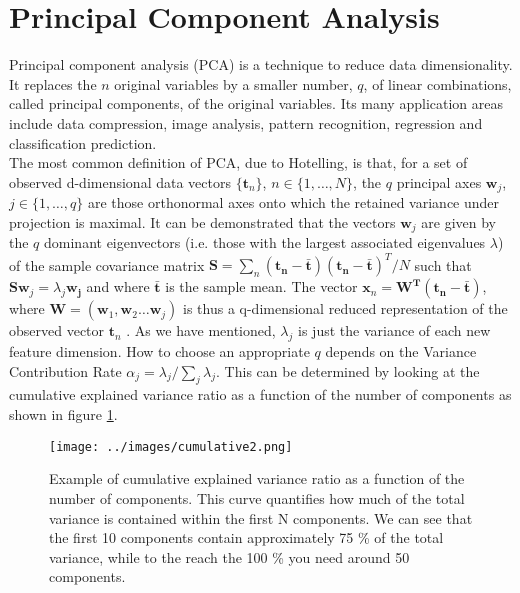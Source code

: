 \documentclass{standalone}
\begin{document}
\section{Principal Component Analysis}
Principal component analysis (PCA) is a technique to reduce data dimensionality.
It replaces the $n$ original variables by a smaller number, $q$, of linear combinations, called principal components, of the original variables.
Its many application areas include data compression, image analysis, pattern recognition, regression and classification prediction\cite{PCA}.\\
The most common definition of PCA, due to Hotelling, is that, for a set of observed d-dimensional data vectors 
$ \{ \mathbf{t}_{n} \}$, $n \in \{1, \dots, N \} $, the $q$ principal axes $\mathbf{w}_j$, $j \in \{ 1, \dots, q \} $ are those orthonormal axes onto which the retained variance under projection is maximal.
It can be demonstrated that the vectors $\mathbf{w}_j$ are given by the $q$ dominant eigenvectors (i.e. those with the largest associated eigenvalues $\lambda$) of the sample covariance matrix $\mathbf{S} = \sum_{n}^{} ( \mathbf{t_n} - \mathbf{\bar{t}}) ( \mathbf{t_n} - \mathbf{\bar{t}})^T / N$ such that  $ \mathbf{S}\mathbf{w}_j = \lambda_j \mathbf{w_j}$ and where $\mathbf{\bar{t}}$ is the sample mean.
The vector $\mathbf{x}_{n} = \mathbf{W^T} (\mathbf{t_n} - \mathbf{\bar{t}})$, where $ \mathbf{W} = (\mathbf{w}_1 , \mathbf{w}_2 \dots \mathbf{w}_j)$ is thus a q-dimensional reduced representation of the observed vector $\mathbf{t}_{n}$ \cite{PCA}.
As we have mentioned, $\lambda_j$ is just the variance of each new feature dimension.
How to choose an appropriate $q$ depends on the Variance Contribution Rate  $\alpha_j = \lambda_j / \sum_{j}^{} \lambda_j $. 
This can be determined by looking at the cumulative explained variance ratio as a function of the number of components as shown in figure \ref{cumulativevr}.

\begin{figure}[ht]

    \centering
    \texttt{[image: ../images/cumulative2.png]}
    
    \caption{Example of cumulative explained variance ratio as a function of the number of components. This curve quantifies how much of the total variance is contained within the first N components. We can see that the first 10 components contain approximately 75 \% of the total variance, while to the reach the 100 \% you need around 50 components.}
    \label{cumulativevr}
    
    \end{figure}
\end{document}

